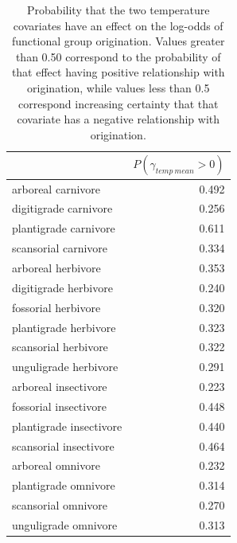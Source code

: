 \documentclass[12pt,letterpaper]{article}
\begin{document}
\begin{table}[ht]
  \centering
  \caption[Posterior probablity of effects of temperature on origination]{Probability that the two temperature covariates have an effect on the log-odds of functional group origination. Values greater than 0.50 correspond to the probability of that effect having positive relationship with origination, while values less than 0.5 correspond increasing certainty that that covariate has a negative relationship with origination.}
  \label{tab:origin_temp}
  \begin{tabular}{ l r }
    \hline
    & \(P(\gamma_{temp\ mean} > 0)\) \\
    \hline
    arboreal carnivore & 0.492 \\ 
    digitigrade carnivore & 0.256 \\ 
    plantigrade carnivore & 0.611 \\ 
    scansorial carnivore & 0.334 \\ 
    arboreal herbivore & 0.353 \\ 
    digitigrade herbivore & 0.240 \\ 
    fossorial herbivore & 0.320 \\ 
    plantigrade herbivore & 0.323 \\ 
    scansorial herbivore & 0.322 \\ 
    unguligrade herbivore & 0.291 \\ 
    arboreal insectivore & 0.223 \\ 
    fossorial insectivore & 0.448 \\ 
    plantigrade insectivore & 0.440 \\ 
    scansorial insectivore & 0.464 \\ 
    arboreal omnivore & 0.232 \\ 
    plantigrade omnivore & 0.314 \\ 
    scansorial omnivore & 0.270 \\ 
    unguligrade omnivore & 0.313 \\ 
    \hline
  \end{tabular}
\end{table}
\end{document}

